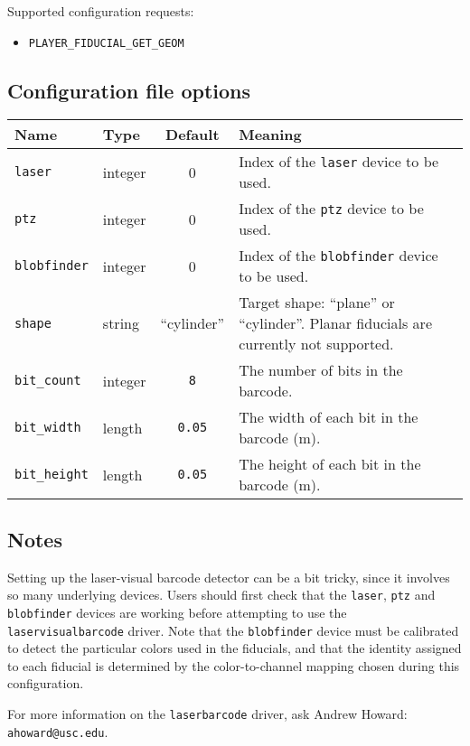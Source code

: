 \noindent Supported configuration requests:
\begin{itemize}
\item \verb+PLAYER_FIDUCIAL_GET_GEOM+
\end{itemize}


\subsection*{Configuration file options}

\begin{center}
{\small \begin{tabularx}{\columnwidth}{|l|l|c|X|}
\hline
Name & Type & Default & Meaning\\
\hline
{\tt laser} & integer & 0 & Index of the {\tt laser} device to be used.\\
{\tt ptz} & integer & 0 & Index of the {\tt ptz} device to be used.\\
{\tt blobfinder} & integer & 0 & Index of the {\tt blobfinder} device to be used.\\
{\tt shape} & string & ``cylinder'' & Target shape: ``plane'' or ``cylinder''.
Planar fiducials are currently not supported. \\
{\tt bit\_count} & integer & {\tt 8} & The number of bits in the barcode.\\
{\tt bit\_width} & length & {\tt 0.05} & The width of each bit in the barcode (m).\\
{\tt bit\_height} & length & {\tt 0.05} & The height of each bit in the barcode (m).\\
\hline
\end{tabularx}}
\end{center}

\subsection*{Notes}

Setting up the laser-visual barcode detector can be a bit tricky,
since it involves so many underlying devices.  Users should first
check that the {\tt laser}, {\tt ptz} and {\tt blobfinder} devices are
working before attempting to use the {\tt laservisualbarcode} driver.
Note that the {\tt blobfinder} device must be calibrated to detect the
particular colors used in the fiducials, and that the identity
assigned to each fiducial is determined by the color-to-channel
mapping chosen during this configuration.

For more information on the {\tt laserbarcode} driver, ask Andrew Howard:
{\tt ahoward@usc.edu}.
